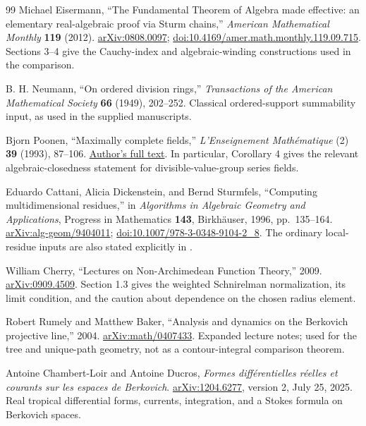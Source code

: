 \documentclass[11pt,letterpaper]{article}
\theoremstyle{definition}
\theoremstyle{remark}
\numberwithin{equation}{section}
\begin{document}
\begin{thebibliography}{99}
Michael Eisermann,
``The Fundamental Theorem of Algebra made effective: an elementary real-algebraic proof via Sturm chains,''
\emph{American Mathematical Monthly} \textbf{119} (2012).
\href{https://arxiv.org/abs/0808.0097}{arXiv:0808.0097};
\href{https://doi.org/10.4169/amer.math.monthly.119.09.715}{doi:10.4169/amer.math.monthly.119.09.715}.
Sections 3--4 give the Cauchy-index and algebraic-winding constructions used in the comparison.

B. H. Neumann, ``On ordered division rings,''
\emph{Transactions of the American Mathematical Society} \textbf{66} (1949), 202--252.
Classical ordered-support summability input, as used in the supplied manuscripts.

Bjorn Poonen, ``Maximally complete fields,''
\emph{L'Enseignement Math\'ematique} (2) \textbf{39} (1993), 87--106.
\href{https://math.mit.edu/~poonen/papers/amsval.pdf}{Author's full text}.
In particular, Corollary 4 gives the relevant algebraic-closedness statement for divisible-value-group series fields.

Eduardo Cattani, Alicia Dickenstein, and Bernd Sturmfels,
``Computing multidimensional residues,'' in \emph{Algorithms in Algebraic Geometry and Applications}, Progress in Mathematics \textbf{143}, Birkh\"auser, 1996, pp.~135--164.
\href{https://arxiv.org/abs/alg-geom/9404011}{arXiv:alg-geom/9404011};
\href{https://doi.org/10.1007/978-3-0348-9104-2_8}{doi:10.1007/978-3-0348-9104-2\_8}.
The ordinary local-residue inputs are also stated explicitly in \cite{Geometry}.

William Cherry, ``Lectures on Non-Archimedean Function Theory,'' 2009.
\href{https://arxiv.org/abs/0909.4509}{arXiv:0909.4509}.
Section 1.3 gives the weighted Schnirelman normalization, its limit condition, and the caution about dependence on the chosen radius element.

Robert Rumely and Matthew Baker,
``Analysis and dynamics on the Berkovich projective line,'' 2004.
\href{https://arxiv.org/abs/math/0407433}{arXiv:math/0407433}.
Expanded lecture notes; used for the tree and unique-path geometry, not as a contour-integral comparison theorem.

Antoine Chambert-Loir and Antoine Ducros,
\emph{Formes diff\'erentielles r\'eelles et courants sur les espaces de Berkovich}.
\href{https://arxiv.org/abs/1204.6277}{arXiv:1204.6277}, version 2, July 25, 2025.
Real tropical differential forms, currents, integration, and a Stokes formula on Berkovich spaces.


\end{thebibliography}
\end{document}
